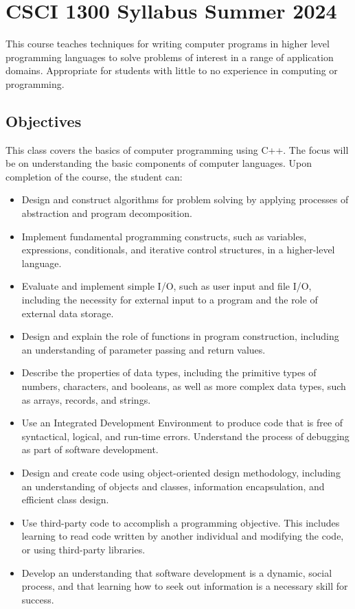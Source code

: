 \chapter*{CSCI 1300 Syllabus Summer 2024}

This course teaches techniques for writing computer programs in higher level programming languages to solve problems of interest in a range of application domains. Appropriate for students with little to no experience in computing or programming.

\section{Objectives}
This class covers the basics of computer programming using C++. The focus will be on understanding the basic components of computer languages. Upon completion of the course, the student can:

\begin{itemize}
    \item Design and construct algorithms for problem solving by applying processes of abstraction and program decomposition.
    \item Implement fundamental programming constructs, such as variables, expressions, conditionals, and iterative control structures, in a higher-level language.
    \item Evaluate and implement simple I/O, such as user input and file I/O, including the necessity for external input to a program and the role of external data storage.
    \item Design and explain the role of functions in program construction, including an understanding of parameter passing and return values.
    \item Describe the properties of data types, including the primitive types of numbers, characters, and booleans, as well as more complex data types, such as arrays, records, and strings.
    \item Use an Integrated Development Environment to produce code that is free of syntactical, logical, and run-time errors. Understand the process of debugging as part of software development.
    \item Design and create code using object-oriented design methodology, including an understanding of objects and classes, information encapsulation, and efficient class design.
    \item Use third-party code to accomplish a programming objective. This includes learning to read code written by another individual and modifying the code, or using third-party libraries.
    \item Develop an understanding that software development is a dynamic, social process, and that learning how to seek out information is a necessary skill for success.
\end{itemize}

